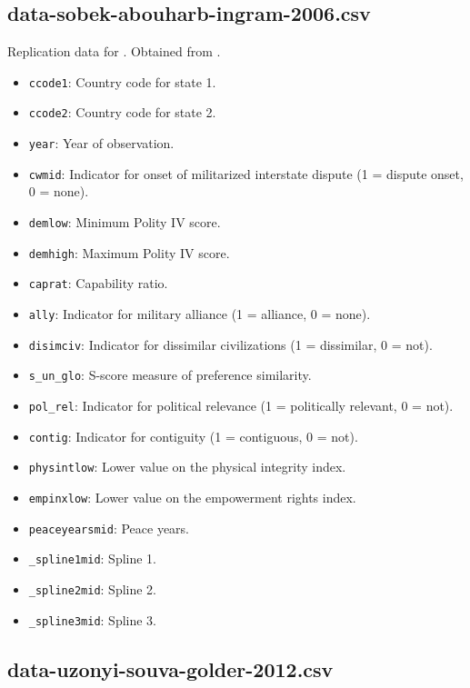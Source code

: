 \documentclass[12pt]{article}
\begin{document}
\subsection{data-sobek-abouharb-ingram-2006.csv}

Replication data for \citet{Sobek:2006cn}.
Obtained from \citet{sobek2006data}.

\begin{itemize}
  \item \texttt{ccode1}: Country code for state 1.
  \item \texttt{ccode2}: Country code for state 2.
  \item \texttt{year}: Year of observation.
  \item \texttt{cwmid}: Indicator for onset of militarized interstate dispute (1 = dispute onset, 0 = none).
  \item \texttt{demlow}: Minimum Polity IV score.
  \item \texttt{demhigh}: Maximum Polity IV score.
  \item \texttt{caprat}: Capability ratio.
  \item \texttt{ally}: Indicator for military alliance (1 = alliance, 0 = none).
  \item \texttt{disimciv}: Indicator for dissimilar civilizations (1 = dissimilar, 0 = not).
  \item \texttt{s\_un\_glo}: S-score measure of preference similarity.
  \item \texttt{pol\_rel}: Indicator for political relevance (1 = politically relevant, 0 = not).
  \item \texttt{contig}: Indicator for contiguity (1 = contiguous, 0 = not).
  \item \texttt{physintlow}: Lower value on the physical integrity index.
  \item \texttt{empinxlow}: Lower value on the empowerment rights index.
  \item \texttt{peaceyearsmid}: Peace years.
  \item \texttt{\_spline1mid}: Spline 1.
  \item \texttt{\_spline2mid}: Spline 2.
  \item \texttt{\_spline3mid}: Spline 3.
\end{itemize}

\subsection{data-uzonyi-souva-golder-2012.csv}
\end{document}
